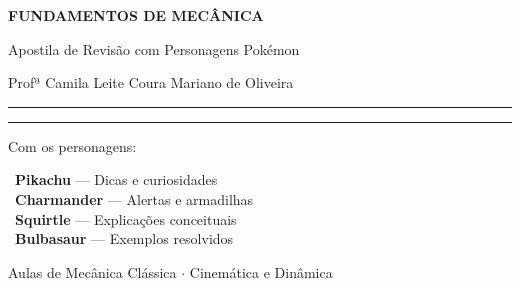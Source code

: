\documentclass[10.5pt, a4paper]{extarticle}
\begin{document}

\begin{titlepage}
  \centering
  \vspace*{2cm}
  {\Huge\bfseries\color{pokered} FUNDAMENTOS DE MECÂNICA\par}
  \vspace{0.5cm}
  {\LARGE\color{pokered} Apostila de Revisão com Personagens Pokémon\par}
  \vspace{0.3cm}
  {\large\color{pokered} Profª Camila Leite Coura Mariano de Oliveira\par}
  \vspace{1.5cm}
  \rule{0.8\textwidth}{0.4pt}
  \vspace{1cm}


  \vspace{1cm}
  \rule{0.8\textwidth}{0.4pt}
  \vspace{1cm}

  {\Large Com os personagens:\par}
  \vspace{0.4cm}
  {\large
    \faLightbulb\ \textbf{Pikachu} --- Dicas e curiosidades\\[4pt]
    \faBurn\ \textbf{Charmander} --- Alertas e armadilhas\\[4pt]
    \faTint\ \textbf{Squirtle} --- Explicações conceituais\\[4pt]
    \faLeaf\ \textbf{Bulbasaur} --- Exemplos resolvidos
  }

  \vfill
  {\normalsize Aulas de Mecânica Clássica $\cdot$ Cinemática e Dinâmica\par}
\end{titlepage}
\end{document}

